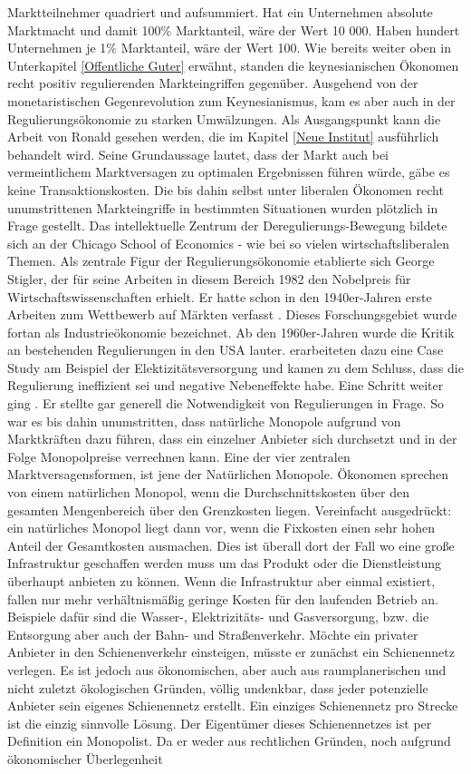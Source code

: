 Marktteilnehmer quadriert und aufsummiert. Hat ein Unternehmen absolute Marktmacht und damit 100\% Marktanteil, wäre der Wert 10 000. Haben hundert Unternehmen je 1\% Marktanteil, wäre der Wert 100. Wie bereits weiter oben in Unterkapitel \ref{Offentliche Guter} erwähnt, standen die keynesianischen Ökonomen recht positiv regulierenden Markteingriffen gegenüber. Ausgehend von der monetaristischen Gegenrevolution zum Keynesianismus, kam es aber auch in der Regulierungsökonomie zu starken Umwälzungen. Als Ausgangspunkt kann die Arbeit von Ronald \textcite{Coase1960} gesehen werden, die im Kapitel \ref{Neue Institut} ausführlich behandelt wird. Seine Grundaussage lautet, dass der Markt auch bei vermeintlichem Marktversagen zu optimalen Ergebnissen führen würde, gäbe es keine Transaktionskosten. Die bis dahin selbst unter liberalen Ökonomen recht unumstrittenen Markteingriffe in bestimmten Situationen wurden plötzlich in Frage gestellt. Das intellektuelle Zentrum der Deregulierungs-Bewegung bildete sich an der Chicago School of Economics - wie bei so vielen wirtschaftsliberalen Themen. Als zentrale Figur der Regulierungsökonomie etablierte sich George Stigler, der für seine Arbeiten in diesem Bereich 1982 den Nobelpreis für Wirtschaftswissenschaften erhielt. Er hatte schon in den 1940er-Jahren erste Arbeiten zum Wettbewerb auf Märkten verfasst \parencite{Stigler1942, Stigler1950}. Dieses Forschungsgebiet wurde fortan als Industrieökonomie bezeichnet. Ab den 1960er-Jahren wurde die Kritik an bestehenden Regulierungen in den USA lauter. \textcite{Stigler1962} erarbeiteten dazu eine Case Study am Beispiel der Elektizitätsversorgung und kamen zu dem Schluss, dass die Regulierung ineffizient sei und negative Nebeneffekte habe. Eine Schritt weiter ging \textcite{Demsetz1968}. Er stellte gar generell die Notwendigkeit von Regulierungen in Frage. So war es bis dahin unumstritten, dass natürliche Monopole aufgrund von Marktkräften dazu führen, dass ein einzelner Anbieter sich durchsetzt und in der Folge Monopolpreise verrechnen kann. Eine der vier zentralen Marktversagensformen, ist jene der Natürlichen Monopole. Ökonomen sprechen von einem natürlichen Monopol, wenn die Durchschnittskosten über den gesamten Mengenbereich über den Grenzkosten liegen. Vereinfacht ausgedrückt: ein natürliches Monopol liegt dann vor, wenn die Fixkosten einen sehr hohen Anteil der Gesamtkosten ausmachen. Dies ist überall dort der Fall wo eine große Infrastruktur geschaffen werden muss um das Produkt oder die Dienstleistung überhaupt anbieten zu können. Wenn die Infrastruktur aber einmal existiert, fallen nur mehr verhältnismäßig geringe Kosten für den laufenden Betrieb an. Beispiele dafür sind die Wasser-, Elektrizitäts- und Gasversorgung, bzw. die Entsorgung aber auch der Bahn- und Straßenverkehr. Möchte ein privater Anbieter in den Schienenverkehr einsteigen, müsste er zunächst ein Schienennetz verlegen. Es ist jedoch aus ökonomischen, aber auch aus raumplanerischen und nicht zuletzt ökologischen Gründen, völlig undenkbar, dass jeder potenzielle Anbieter sein eigenes Schienennetz erstellt. Ein einziges Schienennetz pro Strecke ist die einzig sinnvolle Lösung. Der Eigentümer dieses Schienennetzes ist per Definition ein Monopolist. Da er weder aus rechtlichen Gründen, noch aufgrund ökonomischer Überlegenheit 